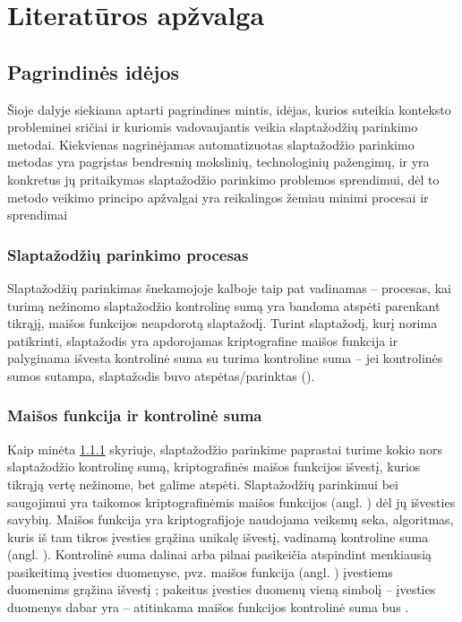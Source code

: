 \documentclass{VUMIFInfBakalaurinis}
\begin{document}
\section{Literatūros apžvalga}
\subsection{Pagrindinės idėjos}
Šioje dalyje siekiama aptarti pagrindines mintis, idėjas, kurios suteikia 
konteksto probleminei sričiai ir kuriomis vadovaujantis veikia slaptažodžių 
parinkimo metodai. Kiekvienas nagrinėjamas automatizuotas slaptažodžio parinkimo 
metodas yra pagrįstas bendresnių mokslinių, technologinių pažengimų, ir yra 
konkretus jų pritaikymas slaptažodžio parinkimo problemos sprendimui, dėl to 
metodo veikimo principo apžvalgai yra reikalingos žemiau minimi procesai ir 
sprendimai

\subsubsection{Slaptažodžių parinkimo procesas} \label{sec:cracking}
Slaptažodžių parinkimas šnekamojoje kalboje taip pat vadinamas 
 -- procesas, kai turimą nežinomo slaptažodžio 
kontrolinę sumą yra bandoma atspėti parenkant tikrąjį, maišos funkcijos 
neapdorotą slaptažodį. Turint slaptažodį, kurį norima patikrinti, slaptažodis 
yra apdorojamas kriptografine maišos funkcija ir palyginama išvesta kontrolinė 
suma su turima kontroline suma -- jei kontrolinės sumos sutampa, slaptažodis 
buvo atspėtas/parinktas ().

\subsubsection{Maišos funkcija ir kontrolinė suma} \label{sec:hashing}
Kaip minėta \ref{sec:cracking} skyriuje, slaptažodžio parinkime paprastai turime 
kokio nors slaptažodžio kontrolinę sumą, kriptografinės maišos funkcijos 
išvestį, kurios tikrąją vertę nežinome, bet galime atspėti. Slaptažodžių 
parinkimui bei saugojimui yra taikomos kriptografinėmis maišos funkcijos (angl. 
) dėl jų išvesties savybių. Maišos funkcija yra 
kriptografijoje naudojama veiksmų seka, algoritmas, kuris iš tam tikros įvesties 
grąžina unikalę išvestį, vadinamą kontroline suma (angl. ). 
Kontrolinė suma dalinai arba pilnai pasikeičia atspindint menkiausią pasikeitimą 
įvesties duomenyse, pvz. maišos funkcija  (angl. 
) įvestiems duomenims  
grąžina išvestį ; pakeitus įvesties 
duomenų vieną simbolį -- įvesties duomenys dabar yra  -- 
atitinkama  maišos funkcijos kontrolinė suma bus 
.
\end{document}
